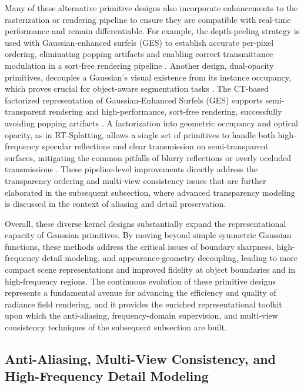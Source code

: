 \documentclass[11pt]{article}
\begin{document}
Many of these alternative primitive designs also incorporate enhancements to the rasterization or rendering pipeline to ensure they are compatible with real-time performance and remain differentiable. For example, the depth-peeling strategy is used with Gaussian-enhanced surfels (GES) to establish accurate per-pixel ordering, eliminating popping artifacts and enabling correct transmittance modulation in a sort-free rendering pipeline \cite{ref69}. Another design, dual-opacity primitives, decouples a Gaussian's visual existence from its instance occupancy, which proves crucial for object-aware segmentation tasks \cite{ref70}. The CT-based factorized representation of Gaussian-Enhanced Surfels (GES) supports semi-transparent rendering and high-performance, sort-free rendering, successfully avoiding popping artifacts \cite{ref24}. A factorization into geometric occupancy and optical opacity, as in RT-Splatting, allows a single set of primitives to handle both high-frequency specular reflections and clear transmission on semi-transparent surfaces, mitigating the common pitfalls of blurry reflections or overly occluded transmissions \cite{ref71}. These pipeline-level improvements directly address the transparency ordering and multi-view consistency issues that are further elaborated in the subsequent subsection, where advanced transparency modeling is discussed in the context of aliasing and detail preservation.

Overall, these diverse kernel designs substantially expand the representational capacity of Gaussian primitives. By moving beyond simple symmetric Gaussian functions, these methods address the critical issues of boundary sharpness, high-frequency detail modeling, and appearance-geometry decoupling, leading to more compact scene representations and improved fidelity at object boundaries and in high-frequency regions. The continuous evolution of these primitive designs represents a fundamental avenue for advancing the efficiency and quality of radiance field rendering, and it provides the enriched representational toolkit upon which the anti-aliasing, frequency-domain supervision, and multi-view consistency techniques of the subsequent subsection are built.

\subsection{Anti-Aliasing, Multi-View Consistency, and High-Frequency Detail Modeling}
\end{document}

